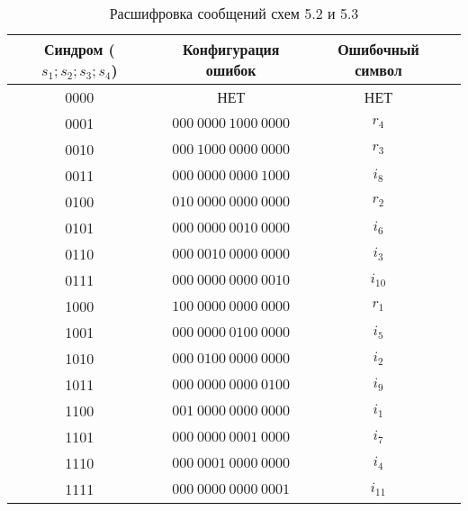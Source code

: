 \begin{table}[h]
\caption{Расшифровка сообщений схем 5.2 и 5.3}

\begin{tabular}{|c|c|c|c|}
\hline
Синдром ($s_1;s_2;s_3;s_4$) & Конфигурация ошибок & Ошибочный символ\\
\hline
0000 & НЕТ & НЕТ \\
0001 & $000\ 0000\ 1000\ 0000$ & $r_4$ \\
0010 & $000\ 1000\ 0000\ 0000$ & $r_3$ \\
0011 & $000\ 0000\ 0000\ 1000$ & $i_8$ \\
0100 & $010\ 0000\ 0000\ 0000$ & $r_2$ \\
0101 & $000\ 0000\ 0010\ 0000$ & $i_6$ \\
0110 & $000\ 0010\ 0000\ 0000$ & $i_3$ \\
0111 & $000\ 0000\ 0000\ 0010$ & $i_{10}$\\
1000 & $100\ 0000\ 0000\ 0000$ & $r_1$\\
1001 & $000\ 0000\ 0100\ 0000$ & $i_5$\\
1010 & $000\ 0100\ 0000\ 0000$ & $i_2$\\
1011 & $000\ 0000\ 0000\ 0100$ & $i_9$\\
1100 & $001\ 0000\ 0000\ 0000$ & $i_1$\\
1101 & $000\ 0000\ 0001\ 0000$ & $i_7$\\
1110 & $000\ 0001\ 0000\ 0000$ & $i_4$\\
1111 & $000\ 0000\ 0000\ 0001$ & $i_{11}$\\
\hline
\end{tabular}
\end{table}